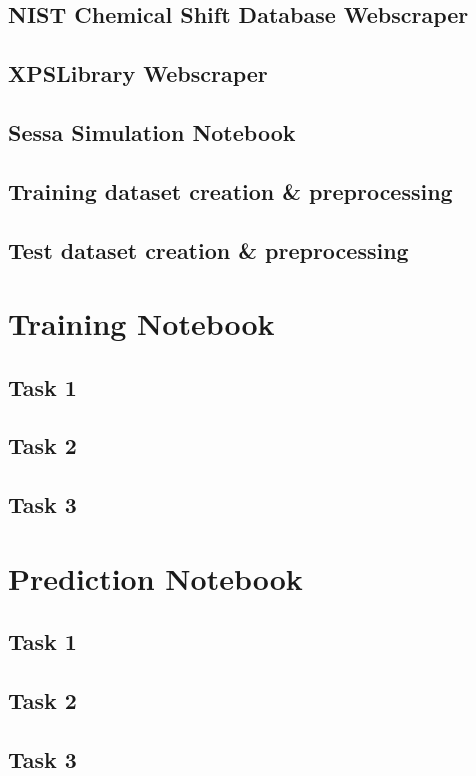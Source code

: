 \subsection{NIST Chemical Shift Database Webscraper}
\label{NIST_WebScraper}


\subsection{XPSLibrary Webscraper}
\label{xpslibrary_webscraper}


\subsection{Sessa Simulation Notebook}
\label{xpslibrary_webscraper}


\subsection{Training dataset creation \& preprocessing}
\label{train_data_generation}


\subsection{Test dataset creation \& preprocessing}
\label{train_data_generation}


\section{Training Notebook}
\subsection{Task 1}

\subsection{Task 2}

\subsection{Task 3}




\section{Prediction Notebook}
\subsection{Task 1}

\subsection{Task 2}

\subsection{Task 3}

